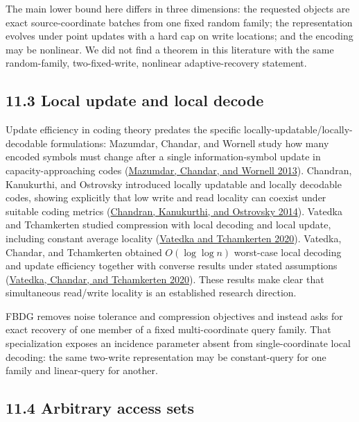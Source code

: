 \documentclass[
]{article}
\begin{document}
The main lower bound here differs in three dimensions: the requested
objects are exact source-coordinate batches from one fixed random
family; the representation evolves under point updates with a hard cap
on write locations; and the encoding may be nonlinear. We did not find a
theorem in this literature with the same random-family, two-fixed-write,
nonlinear adaptive-recovery statement.

\hypertarget{local-update-and-local-decode}{%
\subsection{11.3 Local update and local
decode}\label{local-update-and-local-decode}}

Update efficiency in coding theory predates the specific
locally-updatable/locally-decodable formulations: Mazumdar, Chandar, and
Wornell study how many encoded symbols must change after a single
information-symbol update in capacity-approaching codes
(\protect\hyperlink{ref-mazumdar2013update}{Mazumdar, Chandar, and
Wornell 2013}). Chandran, Kanukurthi, and Ostrovsky introduced locally
updatable and locally decodable codes, showing explicitly that low write
and read locality can coexist under suitable coding metrics
(\protect\hyperlink{ref-chandran2014luldc}{Chandran, Kanukurthi, and
Ostrovsky 2014}). Vatedka and Tchamkerten studied compression with local
decoding and local update, including constant average locality
(\protect\hyperlink{ref-vatedka2020bigdata}{Vatedka and Tchamkerten
2020}). Vatedka, Chandar, and Tchamkerten obtained \(O(\log\log n)\)
worst-case local decoding and update efficiency together with converse
results under stated assumptions
(\protect\hyperlink{ref-vatedka2020worstcase}{Vatedka, Chandar, and
Tchamkerten 2020}). These results make clear that simultaneous
read/write locality is an established research direction.

FBDG removes noise tolerance and compression objectives and instead asks
for exact recovery of one member of a fixed multi-coordinate query
family. That specialization exposes an incidence parameter absent from
single-coordinate local decoding: the same two-write representation may
be constant-query for one family and linear-query for another.

\hypertarget{arbitrary-access-sets}{%
\subsection{11.4 Arbitrary access sets}\label{arbitrary-access-sets}}
\end{document}
